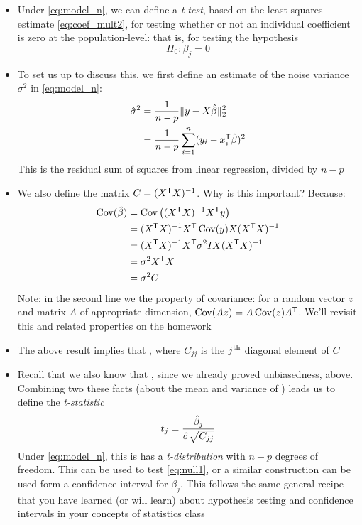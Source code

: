 \documentclass{article}
\begin{document}
\begin{itemize}
\item Under \eqref{eq:model_n}, we can define a \emph{t-test}, based on the
  least squares estimate \eqref{eq:coef_mult2}, for testing whether or not an 
  individual coefficient is zero at the population-level: that is, for testing
  the hypothesis 
  \begin{equation}
  \label{eq:null1}
  H_0 : \beta_j = 0
  \end{equation}

\item To set us up to discuss this, we first define an estimate of the noise
  variance $\sigma^2$ in \eqref{eq:model_n}:
  \begin{align*}
  \hat\sigma^2 &= \frac{1}{n-p} \|y - X\hat{\beta}\|_2^2 \\ 
  &= \frac{1}{n-p} \sum_{i=1}^n (y_ i - x_i^{\mathsf{T}} \hat{\beta})^2 
  \end{align*}
  This is the residual sum of squares from linear regression, divided by $n-p$ 

\item We also define the matrix $C = (X^{\mathsf{T}} X)^{-1}$. Why is this important?
  Because: 
  \begin{align*}
  \operatorname{Cov}(\hat{\beta}) &= \operatorname{Cov}\big( (X^{\mathsf{T}} X)^{-1} X^{\mathsf{T}} y \big) \\
  &= (X^{\mathsf{T}} X)^{-1} X^{\mathsf{T}} \operatorname{Cov}(y) X (X^{\mathsf{T}} X)^{-1} \\
  &=  (X^{\mathsf{T}} X)^{-1} X^{\mathsf{T}} \sigma^2 I X (X^{\mathsf{T}} X)^{-1} \\
  &= \sigma^2 X^{\mathsf{T}} X \\
  &= \sigma^2 C
  \end{align*}
  Note: in the second line we the property of covariance: for a random vector
  $z$ and matrix $A$ of appropriate dimension, $\operatorname{Cov}(Az) = A \operatorname{Cov}(z)
  A^{\mathsf{T}}$. We'll revisit this and related properties on the homework

\item The above result implies that ,
  where $C_{jj}$ is the $j^{\textnormal{th}}$ diagonal element of $C$

\item Recall that we also know that , since we
  already proved unbiasedness, above. Combining two these facts (about the mean 
  and variance of ) leads us to define the \emph{t-statistic}  
  \begin{equation}
  \label{eq:t_stat}
  t_j = \frac{\hat{\beta}_j}{\hat\sigma \sqrt{C_{jj}}} 
  \end{equation}
  Under \eqref{eq:model_n}, this is has a \emph{t-distribution} with $n-p$
  degrees of freedom. This can be used to test \eqref{eq:null1}, or a similar
  construction can be used form a confidence interval for $\beta_j$. This
  follows the same general recipe that you have learned (or will learn) about
  hypothesis testing and confidence intervals in your concepts of statistics
  class 


\end{itemize}
\end{document}
